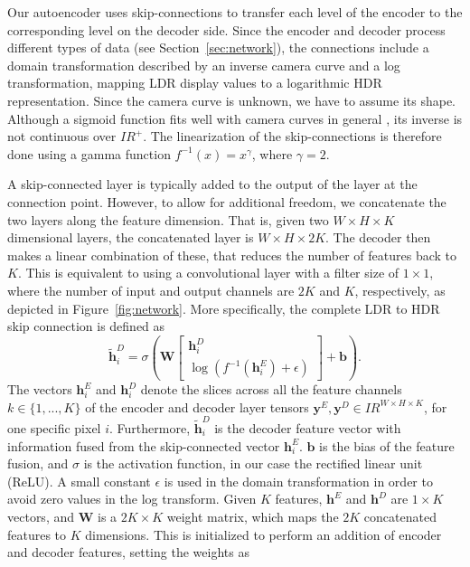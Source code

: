 \documentclass[acmtog]{acmart}
\newcommand{\figref}[1]{Figure~\ref{fig:#1}}
\newcommand{\secref}[1]{Section~\ref{sec:#1}}
\newcommand{\Real}{\ensuremath{I\!R}}
\newcommand{\vect}[1]{\boldsymbol{#1}}
\newcommand{\cc}{f}
\newcommand{\feat}{\vect{h}}
\begin{document}
Our autoencoder uses skip-connections to transfer each level of the encoder to the corresponding level on the decoder side. Since the encoder and decoder process different types of data (see \secref{network}), the connections include a domain transformation described by an inverse camera curve and a log transformation, mapping LDR display values to a logarithmic HDR representation. Since the camera curve is unknown, we have to assume its shape. Although a sigmoid function fits well with camera curves in general \cite{Grossberg2003}, its inverse is not continuous over $\Real^+$. The linearization of the skip-connections is therefore done using a gamma function $\cc^{-1}(x) = x^\gamma$, where $\gamma = 2$.

A skip-connected layer is typically added to the output of the layer at the connection point. However, to allow for additional freedom, we concatenate the two layers along the feature dimension. That is, given two $W\times H\times K$ dimensional layers, the concatenated layer is $W\times H\times 2K$. The decoder then makes a linear combination of these, that reduces the number of features back to $K$. This is equivalent to using a convolutional layer with a filter size of $1 \times 1$, where the number of input and output channels are $2K$ and $K$, respectively, as depicted in \figref{network}. More specifically, the complete LDR to HDR skip connection is defined as
\begin{equation}
\tilde{\feat}_i^D = \sigma \left(\vect{W} 
\begin{bmatrix}
\feat_i^D \\  \log \left( \cc^{-1}\left( \feat_i^E \right) + \epsilon \right)
\end{bmatrix}
+ \vect{b} \right).
\end{equation}
The vectors $\feat_i^E$ and $\feat_i^D$ denote the slices across all the feature channels $k \in \{1,...,K\}$ of the encoder and decoder layer tensors $\vect{y}^E, \vect{y}^D \in \Real^{W\times H\times K}$, for one specific pixel $i$. 
Furthermore, $\tilde{\feat}_i^D$ is the decoder feature vector with information fused from the skip-connected vector $\feat_i^E$.
$\vect{b}$ is the bias of the feature fusion, and $\sigma$ is the activation function, in our case the rectified linear unit (ReLU). A small constant $\epsilon$ is used in the domain transformation in order to avoid zero values in the log transform. Given $K$ features, $\feat^E$ and $\feat^D$ are $1\times K$ vectors, and $\vect{W}$ is a $2K \times K$ weight matrix, which maps the $2K$ concatenated features to $K$ dimensions. This is initialized to perform an addition of encoder and decoder features, setting the weights as
\end{document}
